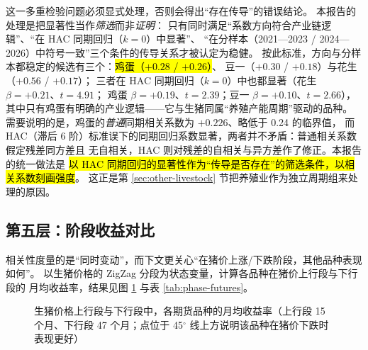 这一多重检验问题必须显式处理，否则会得出“存在传导”的错误结论。
本报告的处理是把显著性当作\emph{筛选}而非\emph{证明}：
只有同时满足“系数方向符合产业链逻辑”、“在 HAC 同期回归（$k=0$）中显著”、
“在分样本（2021---2023 / 2024---2026）中符号一致”三个条件的传导关系才被认定为稳健。
按此标准，方向与分样本都稳定的候选有三个：\hl{鸡蛋（$+0.28$ / $+0.26$）}、
豆一（$+0.30$ / $+0.18$）与花生（$+0.56$ / $+0.17$）；
三者在 HAC 同期回归（$k=0$）中也都显著（花生 $\beta=+0.21$、$t=4.91$；
鸡蛋 $\beta=+0.19$、$t=2.39$；豆一 $\beta=+0.10$、$t=2.66$），
其中只有鸡蛋有明确的产业逻辑——它与生猪同属“养殖产能周期”驱动的品种。
需要说明的是，鸡蛋的\emph{普通}同期相关系数为 $+0.226$、略低于 0.24 的临界值，
而 HAC（滞后 6 阶）标准误下的同期回归系数显著，两者并不矛盾：普通相关系数假定残差同方差且
无自相关，HAC 则对残差的自相关与异方差作了修正。本报告的统一做法是
\hl{以 HAC 同期回归的显著性作为“传导是否存在”的筛选条件，以相关系数刻画强度}。
这正是第 \ref{sec:other-livestock} 节把养殖业作为独立周期组来处理的原因。

\subsection{第五层：阶段收益对比}
\label{sec:corr-phase}

相关性度量的是“同时变动”，而下文更关心“在猪价上涨/下跌阶段，其他品种表现如何”。
以生猪价格的 ZigZag 分段为状态变量，计算各品种在猪价上行段与下行段的
月均收益率，结果见图 \ref{fig:phase-scatter} 与表 \ref{tab:phase-futures}。

\begin{figure}[htbp]
\centering
{}
\caption{生猪价格上行段与下行段中，各期货品种的月均收益率（上行段 15 个月、下行段 47 个月；点位于 45$^\circ$ 线上方说明该品种在猪价下跌时表现更好）}
\label{fig:phase-scatter}
\end{figure}

